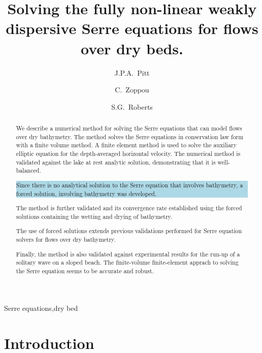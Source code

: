 \documentclass[times]{elsarticle}
\newcommand{\hlb}[1] {\par\colorbox{lightblue}{\parbox{\linewidth}{#1}}}
\newcommand{\hlr}[1] {\par\colorbox{lightred}{\parbox{\linewidth}{#1}}}
\newcommand{\hlb}[1] {{#1}}
\newcommand{\hlr}[1] {{}}
\begin{document}
\title{Solving the fully non-linear weakly dispersive Serre equations for flows over dry beds.}

\author[ANU]{J.P.A.~Pitt}
\author[ANU]{C.~Zoppou}
\author[ANU]{S.G.~Roberts}

\address[ANU]{Mathematical Sciences Institute, Australian National University, Canberra, ACT 0200, Australia}


 \begin{abstract}
 	We describe a numerical method for solving the Serre equations that can model flows over dry bathymetry. The method solves the Serre equations in conservation law form with a finite volume method. A finite element method is used to solve the auxiliary elliptic equation for the depth-averaged horizontal velocity. The numerical method is validated against the lake at rest analytic solution, demonstrating that it is well-balanced. \hlb{Since there is no analytical solution to the Serre equation that involves bathymetry, a forced solution, involving bathymetry was developed.} The method is further validated and its convergence rate established using the forced solutions containing the wetting and drying of bathymetry. \hlr{The use of forced solutions extends previous validations performed for Serre equation solvers for flows over dry bathymetry.} Finally, the method is also validated against experimental results for the run-up of a solitary wave on a sloped beach. The finite-volume finite-element apprach to solving the Serre equation seems to be accurate and robust.

 \end{abstract}	

  \begin{keyword}
  	Serre equations\sep dry bed
  \end{keyword}

 \maketitle
\linenumbers
\section{Introduction} \label{intro}

\end{document}
